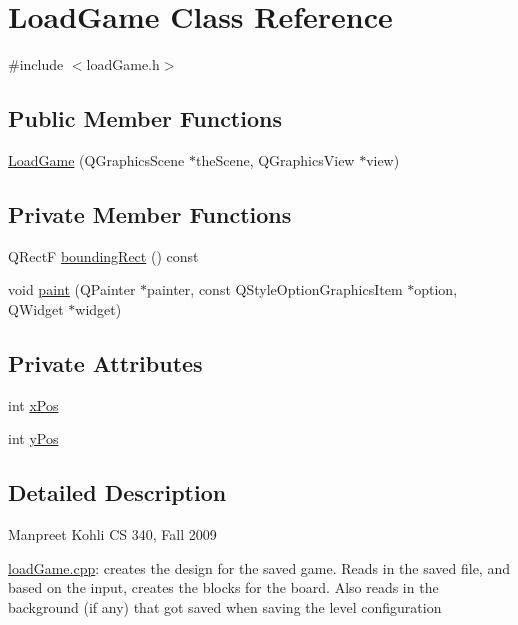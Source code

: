 \hypertarget{class_load_game}{
\section{LoadGame Class Reference}
\label{class_load_game}
}


{\ttfamily \#include $<$loadGame.h$>$}\subsection*{Public Member Functions}
\begin{DoxyCompactItemize}
\item 
\hyperlink{class_load_game_a23098f270c37e5a7eb6796068cad5965}{LoadGame} (QGraphicsScene $\ast$theScene, QGraphicsView $\ast$view)
\end{DoxyCompactItemize}
\subsection*{Private Member Functions}
\begin{DoxyCompactItemize}
\item 
QRectF \hyperlink{class_load_game_a0bea88d2a8f433f8f632b60bec679191}{boundingRect} () const 
\item 
void \hyperlink{class_load_game_a5a33efb42771cf6a0dfacaab5c2e64a8}{paint} (QPainter $\ast$painter, const QStyleOptionGraphicsItem $\ast$option, QWidget $\ast$widget)
\end{DoxyCompactItemize}
\subsection*{Private Attributes}
\begin{DoxyCompactItemize}
\item 
int \hyperlink{class_load_game_ada8b1081dcfe3ce73dcf7f02bc9eb824}{xPos}
\item 
int \hyperlink{class_load_game_a074a34ee4e6924d306030caaaefadc74}{yPos}
\end{DoxyCompactItemize}


\subsection{Detailed Description}
Manpreet Kohli CS 340, Fall 2009

\hyperlink{load_game_8cpp}{loadGame.cpp}: creates the design for the saved game. Reads in the saved file, and based on the input, creates the blocks for the board. Also reads in the background (if any) that got saved when saving the level configuration 

